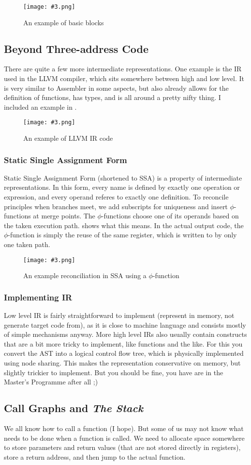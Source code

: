 \documentclass{article}
\newcommand{\fig}[4]{
	\begin{figure}[#1]
		\center
		\texttt{[image: \#3.png]}
		\caption{#4}
		\label{fig:#3}
	\end{figure}
	}
\begin{document}
\fig{h}{}{bbs}{An example of basic blocks}

\subsection{Beyond Three-address Code}
There are quite a few more intermediate representations.
One example is the IR used in the LLVM compiler, which sits somewhere between high and low level.
It is very similar to Assembler in some aspects, but also already allows for the definition of functions, has types, and is all around a pretty nifty thing.
I included an example in .

\fig{h}{}{llvm}{An example of LLVM IR code}

\subsubsection{Static Single Assignment Form}
Static Single Assignment Form (shortened to SSA) is a property of intermediate representations.
In this form, every name is defined by exactly one operation or expression, and every operand referes to exactly one definition.
To reconcile principles when branches meet, we add subscripts for uniqueness and insert $\phi$-functions at merge points.
The $\phi$-functions choose one of its operands based on the taken execution path.
 shows what this means.
In the actual output code, the $\phi$-function is simply the reuse of the same register, which is written to by only one taken path.

\fig{h}{0.5}{ssa}{An example reconciliation in SSA using a $\phi$-function}

\subsubsection{Implementing IR}
Low level IR is fairly straightforward to implement (represent in memory, not generate target code from), as it is close to machine language and consists mostly of simple mechanisms anyway.
More high level IRs also usually contain constructs that are a bit more tricky to implement, like functions and the like.
For this you convert the AST into a logical control flow tree, which is physically implemented using node sharing.
This makes the representation conservative on memory, but slightly trickier to implement.
But you should be fine, you have are in the Master's Programme after all ;)

\subsection{Call Graphs and \emph{The Stack}}
We all know how to call a function (I hope).
But some of us may not know what needs to be done when a function is called.
We need to allocate space somewhere to store parameters and return values (that are not stored directly in registers), store a return address, and then jump to the actual function.
\end{document}
